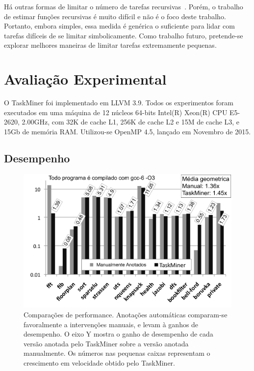 \documentclass[sigplan,10pt,review]{acmart}
\newcommand\Taskminer{\mbox{\textsf{TaskMiner}}}
\begin{document}
Há outras formas de limitar o número de tarefas recursivas~\cite{Iwasaki16}.
Porém, o trabalho de estimar funções recursivas é muito difícil e não é o foco deste trabalho.
Portanto, embora simples, essa medida é genérica o suficiente para lidar com tarefas difíceis de se
limitar simbolicamente. Como trabalho futuro, pretende-se explorar melhores maneiras de
limitar tarefas extremamente pequenas.

\section{Avalia\c{c}\~{a}o Experimental}
\label{sec:eval}

O {\Taskminer} foi implementado em LLVM 3.9. Todos os experimentos
foram executados em uma máquina de 12 núcleos 64-bits Intel(R) Xeon(R) CPU E5-2620, 2.00GHz, com 32K de cache L1, 256K de cache L2 e 15M de cache L3, e 15Gb de memória RAM. Utilizou-se OpenMP 4.5, lançado em 
Novembro de 2015.

\subsection{Desempenho}
\label{sub:performance}

\begin{figure}[b!]
\begin{center}
\includegraphics[width=1\columnwidth]{images/TM_Performance}
\caption{Comparações de performance. Anotações automáticas comparam-se favoralmente a intervenções
manuais, e levam à ganhos de desempenho. O eixo Y mostra o ganho de desempenho de cada versão anotada
pelo {\Taskminer} sobre a versão anotada manualmente. Os números nas pequenas caixas representam
o crescimento em velocidade obtido pelo {\Taskminer}.}
\label{fig:TM_Performance}
\end{center}
\end{figure}
\end{document}
